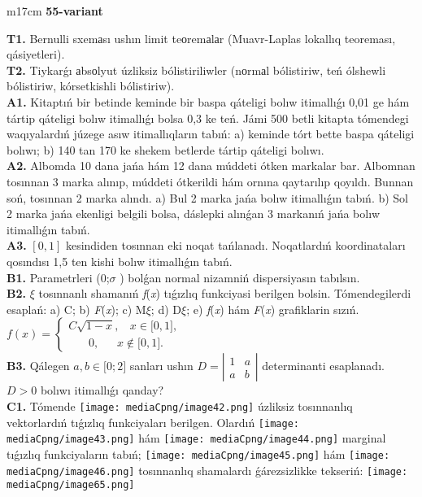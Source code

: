 \documentclass{article}
\begin{document}
\begin{tabular}{m{17cm}}
\textbf{55-variant}
\newline

\textbf{T1.} Bernulli sxemаsı ushın limit teоremаlаr (Muavr-Laplas lokallıq teoreması, qásiyetleri).
 \\
\textbf{T2.} Tiykarǵı аbsоlyut úzliksiz bólistiriliwler (nоrmаl bólistiriw, teń ólshewli bólistiriw, kórsetkishli bólistiriw). 
 \\
\textbf{A1.} Kitaptıń bir betinde keminde bir baspa qáteligi bolıw itimallıǵı 0,01 ge hám tártip qáteligi bolıw itimallıǵı bolsa 0,3 ke teń. Jámi 500 betli kitapta tómendegi waqıyalardıń júzege asıw itimallıqların tabıń: a) keminde tórt bette baspa qáteligi bolıwı; b) 140 tan 170 ke shekem betlerde tártip qáteligi bolıwı.
 \\
\textbf{A2.} 
Albomda 10 dana jańa hám 12 dana múddeti ótken markalar bar. Albomnan tosınnan 3 marka alınıp, múddeti ótkerildi hám ornına qaytarılıp qoyıldı. Bunnan soń, tosınnan 2 marka alındı. a) Bul 2 marka jańa bolıw itimallıǵın tabıń. b) Sol 2 marka jańa ekenligi belgili bolsa, dáslepki alınǵan 3 markanıń jańa bolıw itimallıǵın tabıń.
 \\
\textbf{A3.} $\left[ 0,1 \right]$ kesindiden tosınnan eki noqat tańlanadı. Noqatlardıń koordinataları qosındısı 1,5 ten kishi bolıw itimallıǵın tabıń.
 \\
\textbf{B1.} Parametrleri (0;$\sigma$ ) bolǵan normal nizamniń dispersiyasın tabılsın.
 \\
\textbf{B2.} $\xi$ tosınnanlı shamanıń \emph{f}(\emph{x}) tıǵızlıq funkciyasi berilgen bolsin. Tómendegilerdi esaplań: a) C; b) \emph{F}(\emph{x}); c) M$\xi$; d) D$\xi$; e) \emph{f}(\emph{x}) hám \emph{F}(\emph{x}) grafiklarin sızıń.\(f(x) = \left\{ \begin{matrix}
C\sqrt{1 - x},\ \ \ \ x \in \lbrack 0,1\rbrack, \\
\ \ \ \ \ \ \ \ 0,\ \ \ \ \ \ \ x \notin \lbrack 0,1\rbrack.\ \ 
\end{matrix} \right.\ \)
 \\
\textbf{B3.} Qálegen \(a,b \in \lbrack 0;2\rbrack\) sanları ushın \(D = \left| \begin{matrix}
1 & a \\
a & b
\end{matrix} \right|\) determinanti esaplanadı. \(D > 0\) bolıwı itimallıǵı qanday?
 \\
\textbf{C1.} Tómende \texttt{[image: mediaCpng/image42.png]} úzliksiz tosınnanlıq vektorlardıń tıǵızlıq funkciyaları berilgen. Olardıń \texttt{[image: mediaCpng/image43.png]} hám \texttt{[image: mediaCpng/image44.png]} marginal tıǵızlıq funkciyaların tabıń; \texttt{[image: mediaCpng/image45.png]} hám \texttt{[image: mediaCpng/image46.png]} tosınnanlıq shamalardı ǵárezsizlikke tekseriń: \texttt{[image: mediaCpng/image65.png]}

\end{tabular}
\end{document}

